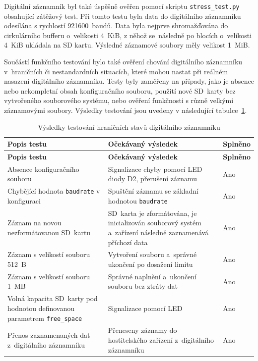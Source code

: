 Digitální záznamník byl také úspěšně ověřen pomocí skriptu \texttt{stress\_test.py} obsahující zátěžový test. Při tomto testu byla data do digitálního záznamníku odesílána s rychlostí 921600~baudů. Data byla nejprve shromažďována do cirkulárního bufferu o~velikosti 4~KiB, z něhož se~následně po blocích o~velikosti 4~KiB ukládala na SD kartu. Výsledné záznamové soubory měly velikost 1~MiB.

Součástí funkčního testování bylo také ověření chování digitálního záznamníku v~hraničních
či nestandardních situacích, které mohou nastat při reálném nasazení digitálního
záznamníku. Testy byly zaměřeny na případy, jako je absence nebo nekompletní obsah konfiguračního
souboru, použití nové SD~karty bez vytvořeného souborového systému, nebo
ověření funkčnosti s různě velkými záznamovými soubory. Výsledky testování jsou uvedeny
v následující tabulce~\ref{tab:test-extremes}.

\begin{longtable}{|p{6cm}|p{5cm}|p{2.5cm}|}
    \caption{Výsledky testování hraničních stavů digitálního záznamníku}
    \label{tab:test-extremes} \\
    \hline
    \textbf{Popis testu} & \textbf{Očekávaný výsledek} & \textbf{Splněno} \\
    \hline
    \endfirsthead

    \hline
    \textbf{Popis testu} & \textbf{Očekávaný výsledek} & \textbf{Splněno} \\
    \hline
    \endhead

    \hline
    \endfoot

    \hline
    \endlastfoot

    Absence konfiguračního souboru & Signalizace chyby pomocí LED diody D2, přerušení záznamu & Ano \\
    \hline
    Chybějící hodnota \texttt{baudrate} v konfiguraci & Spuštění záznamu se základní hodnotou \texttt{baudrate} & Ano \\
    \hline
    Záznam na novou nezformátovanou SD~kartu & SD~karta je zformátována, je inicializován souborový systém a~zařízení následně zaznamenává příchozí data & Ano \\
    \hline
    Záznam s velikostí souboru 512~B & Vytvoření souboru a~správné ukončení po dosažení limitu & Ano \\
    \hline
    Záznam s velikostí souboru 1~MB & Správné naplnění a~ukončení souboru bez ztráty dat & Ano \\
    \hline
    Volná kapacita SD~karty pod hodnotou definovanou parametrem \texttt{free\_space} & Signalizace pomocí LED & Ano \\
    \hline
    Přenos zaznamenaných dat z~digitálního záznamníku & Přeneseny záznamy do hostitelského zařízení z~digitálního záznamníku & Ano \\
    \hline
\end{longtable}

